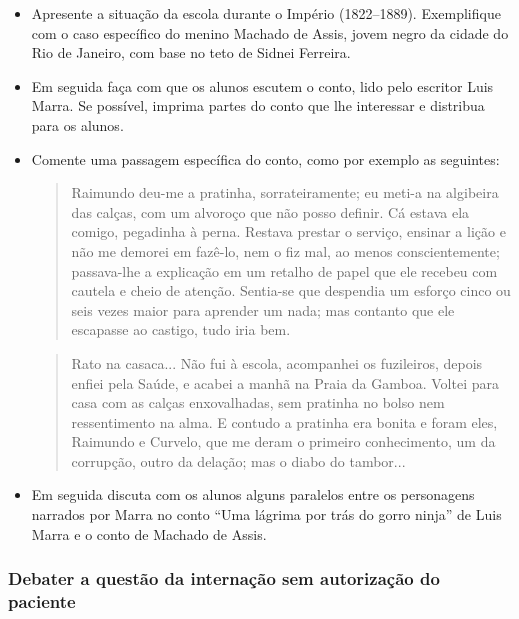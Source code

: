 \documentclass[12pt]{extarticle}
\begin{document}
\begin{itemize}	
	\item Apresente a situação da escola durante o Império (1822--1889). 
	Exemplifique com o caso específico do menino Machado de Assis, jovem 
	negro da cidade do Rio de Janeiro, com base no teto de Sidnei Ferreira.

	\item Em seguida faça com que os alunos escutem o conto, lido pelo 
	escritor Luis Marra. Se possível, imprima partes do conto que lhe 
	interessar e distribua para os alunos. 

	\item Comente uma passagem específica do conto, como por exemplo as seguintes:

\begin{quote}
Raimundo  deu-me  a  pratinha,  sorrateiramente;  eu  meti-a  na  
algibeira  das calças, com um alvoroço que não posso definir. Cá 
estava ela comigo, pegadinha à perna. Restava prestar o serviço, 
ensinar a lição e não me demorei em fazê-lo, nem o  fiz  mal,  
ao  menos  conscientemente;  passava-lhe  a  explicação  em  
um  retalho  de papel que ele recebeu com cautela e cheio de 
atenção. Sentia-se que despendia um esforço  cinco  ou  seis  
vezes  maior  para  aprender  um  nada;  mas  contanto  que  
ele escapasse ao castigo, tudo iria bem.
\end{quote}

\begin{quote}
Rato  na  casaca...  Não  fui  à  escola,  acompanhei  os  
fuzileiros,  depois  enfiei pela Saúde, e acabei a manhã na Praia 
da Gamboa. Voltei para casa com as calças enxovalhadas,  sem  
pratinha  no  bolso  nem  ressentimento  na  alma.  E  contudo  
a pratinha  era  bonita  e  foram  eles,  Raimundo  e  Curvelo,  que  me  
deram  o  primeiro conhecimento, um da corrupção, outro 
da delação; mas o diabo do tambor...					
\end{quote}	
	
	\item Em seguida discuta com os alunos alguns paralelos entre
	os personagens narrados por Marra no conto 
	``Uma lágrima por trás do gorro ninja'' de Luis Marra e o 
	conto de Machado de Assis. 

\end{itemize}

\subsubsection{Debater a questão da internação sem autorização do paciente}
\end{document}
